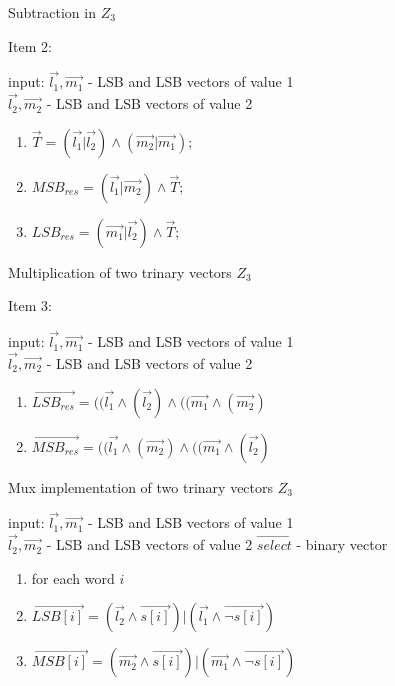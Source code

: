 \begin{algorithm}
		\caption{Subtraction in $Z_3$}
		\label{alg:algpack2} Item 2:

	
		input: $\vec{l_1}, \vec{m_1}$ - LSB and LSB vectors of value 1  \\
                  $\vec{l_2}, \vec{m_2}$ - LSB and LSB vectors of value 2
                  
\begin{enumerate}

	\item $\vec{T} = (\vec{l_1} | \vec{l_2}) \land (\vec{m_2} | \vec{m_1})$;
	\item $MSB_{res} = (\vec{l_1} | \vec{m_2} ) \land \vec{T}$;
    \item $LSB_{res} = (\vec{m_1} | \vec{l_2} ) \land \vec{T}$;
\end{enumerate}
	
	\end{algorithm}



\begin{algorithm}
			\caption{Multiplication of two trinary vectors $Z_3$}
		\label{alg:algpack3} Item 3:

		
				input: $\vec{l_1}, \vec{m_1}$ - LSB and LSB vectors of value 1  \\
		$\vec{l_2}, \vec{m_2}$ - LSB and LSB vectors of value 2
		
			\begin{enumerate}
	\item  $\vec{LSB_{res}} = ((\vec{l_1} \land (\vec{l_2}) \land     ((\vec{m_1} \land (\vec{m_2})       $
	\item	$\vec{MSB_{res}}= ((\vec{l_1} \land (\vec{m_2}) \land     ((\vec{m_1} \land (\vec{l_2})       $

	\end{enumerate}
		
	\end{algorithm}

\begin{algorithm}
		\caption{Mux implementation of two trinary vectors $Z_3$}
			\label{alg:algpack4} 

	
		input:   $\vec{l_1}, \vec{m_1}$ - LSB and LSB vectors of value 1  \\
					$\vec{l_2}, \vec{m_2}$ - LSB and LSB vectors of value 2
					$\vec{select}$ - binary vector

	\begin{enumerate}
		\item for each word $i$
	    \item $\vec{LSB[i]} =( \vec{l_2} \land \vec{s[i]}) | (\vec{l_1} \land \vec{\neg s[i]})$
	    		    \item $\vec{MSB[i]} =( \vec{m_2} \land \vec{s[i]}) | (\vec{m_1} \land \vec{\neg s[i]})$
		
	\end{enumerate}
	
\end{algorithm}



